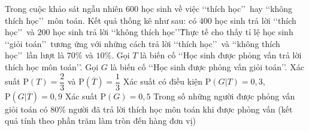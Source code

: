 \begin{ex}%
	Trong cuộc khảo sát ngẫu nhiên $600$ học sinh về việc \lq\lq thích học\rq\rq\ hay \lq\lq không thích học\rq\rq\ môn toán. Kết quả thống kê như sau: có $400$ học sinh trả lời \lq\lq thích học\rq\rq\ và $200$ học sinh trả lời \lq\lq không thích học\rq\rq\. Thực tế cho thấy tỉ lệ học sinh  \lq\lq giỏi toán\rq\rq\ tương ứng với những cách trả lời \lq\lq thích học\rq\rq\ và \lq\lq không thích học\rq\rq\ lần lượt là $70\%$ và $10\%$.
	Gọi $T$ là biến cố \lq\lq Học sinh được phỏng vấn trả lời thích học môn toán\rq\rq. 
	Gọi $G$ là biến cố \lq\lq Học sinh được phỏng  vấn giỏi toán\rq\rq.
	\choiceTF 
		{\True Xác suất $\mathrm{P}(T) = \dfrac{2}{3}$ và $\mathrm{P}(\overline{T})  = \dfrac{1}{3}$}
		{Xác suất có điều kiện $\mathrm{P}(G|T) = 0{,}3$,  $\mathrm{P}(G|\overline{T}) = 0{,}9$}
		{\True Xác suất $\mathrm{P}(G)  = 0{,}5$}
		{Trong số những người được phỏng vấn giỏi toán có $80\%$ người đã trả lời thích học môn toán khi được phỏng vấn (kết quả tính theo phần trăm làm tròn  đến hàng đơn vị)}
\end{ex}


